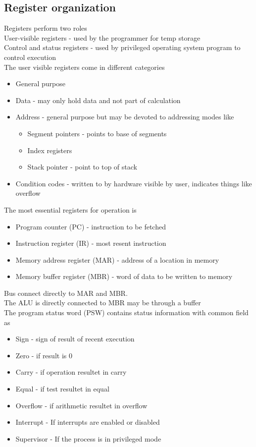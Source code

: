 \documentclass[12pt, a4paper]{article}
\begin{document}
		\subsection{Register organization}
			Registers perform two roles\\
			User-visible registers - used by the programmer for temp storage\\
			Control and status registers - used by privileged operating system program to control execution\\
			The user visible registers come in different categories
			\begin{itemize}
				\item General purpose
				\item Data - may only hold data and not part of calculation
				\item Address - general purpose but may be devoted to addressing modes like
				\begin{itemize}
					\item Segment pointers - points to base of segments
					\item Index registers
					\item Stack pointer - point to top of stack
				\end{itemize}
				\item Condition codes - written to by hardware visible by user, indicates things like overflow
			\end{itemize}
			The most essential registers for operation is
			\begin{itemize}
				\item Program counter (PC) - instruction to be fetched
				\item Instruction register (IR) - most resent instruction
				\item Memory address register (MAR) - address of a location in memory
				\item Memory buffer register (MBR) - word of data to be written to memory
			\end{itemize}
			Bus connect directly to MAR and MBR.\\
			The ALU is directly connected to MBR may be through a buffer\\
			The program status word (PSW) contains status information with common field as
			\begin{itemize}
				\item Sign - sign of result of recent execution
				\item Zero - if result is 0
				\item Carry - if operation resultet in carry
				\item Equal - if test resultet in equal
				\item Overflow - if arithmetic resultet in overflow
				\item Interrupt - If interrupts are enabled or disabled
				\item Supervisor - If the process is in privileged mode
			\end{itemize}
\end{document}

